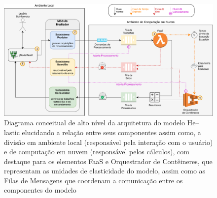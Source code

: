 \documentclass[english,brazilian]{UNISINOSmonografia} %
\begin{document}
\begin{figure}[tb]
\centering%
\begin{minipage}{\textwidth}
	\caption[Diagrama conceitual de alto nível da arquitetura do modelo \textsf{He}--lastic elucidando a relação entre seus componentes, assim como, a divisão em ambiente local e de computação em nuvem, com destaque para os elementos FaaS e Orquestrador de Contêineres, que representam as unidades de elasticidade do modelo, assim como as Filas de Mensagens que coordenam a comunicação entre os componentes do modelo]{Diagrama conceitual de alto nível da arquitetura do modelo \textsf{He}--lastic elucidando a relação entre seus componentes assim como, a divisão em ambiente local (responsável pela interação com o usuário) e de computação em nuvem (responsável pelos cálculos), com destaque para os elementos FaaS e Orquestrador de Contêineres, que representam as unidades de elasticidade do modelo, assim como as Filas de Mensagens que coordenam a comunicação entre os componentes do modelo}
	\label{fig:modelo-arq-full}
	\vspace{1ex}
	\includegraphics[width=\textwidth]{modelo-full}

\end{minipage}
\end{figure}
\end{document}
